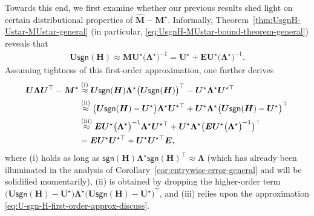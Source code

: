 Towards this end, we first examine whether our previous results shed light on certain distributional properties of $\widehat{\bm{M}}-\bm{M}^{\star}$. 
Informally,  Theorem~\ref{thm:UsgnH-Ustar-MUstar-general} (in particular, \eqref{eq:UsgnH-MUstar-bound-theorem-general}) reveals that
%
\begin{align}
	\bm{U}\mathsf{sgn}(\bm{H}) \approx \bm{M} \bm{U}^{\star} \big(\bm{\Lambda}^{\star}\big)^{-1} 
	= \bm{U}^{\star} + \bm{E} \bm{U}^{\star} \big(\bm{\Lambda}^{\star}\big)^{-1}. 
	\label{eq:U-sgn-H-first-order-approx-discuss}
\end{align}
%
Assuming tightness of this first-order approximation, one further derives 
%
\begin{align}
\bm{U}\bm{\Lambda}\bm{U}^{\top}-\bm{M}^{\star} & \overset{(\mathrm{i})}{\approx}\bm{U}\mathsf{sgn}(\bm{H})\bm{\Lambda}^{\star}\big(\bm{U}\mathsf{sgn}(\bm{H})\big)^{\top}-\bm{U}^{\star}\bm{\Lambda}^{\star}\bm{U}^{\star\top} \notag\\
 & \overset{(\mathrm{ii})}{\approx}\big(\bm{U}\mathsf{sgn}(\bm{H})-\bm{U}^{\star}\big)\bm{\Lambda}^{\star}\bm{U}^{\star\top}+\bm{U}^{\star}\bm{\Lambda}^{\star}\big(\bm{U}\mathsf{sgn}(\bm{H})-\bm{U}^{\star}\big)^{\top} 
 \notag\\
 & \overset{(\mathrm{iii})}{\approx}\bm{E}\bm{U}^{\star}\big(\bm{\Lambda}^{\star}\big)^{-1}\bm{\Lambda}^{\star}\bm{U}^{\star\top}+\bm{U}^{\star}\bm{\Lambda}^{\star}\big(\bm{E}\bm{U}^{\star}\big(\bm{\Lambda}^{\star}\big)^{-1}\big)^{\top} \notag\\
 & =\bm{E}\bm{U}^{\star}\bm{U}^{\star\top}+\bm{U}^{\star}\bm{U}^{\star\top}\bm{E}, 
	\label{eq:approx-ULambdaU-Mstar-discuss}
\end{align}
%
where (i) holds as long as $\mathsf{sgn}(\bm{H})\bm{\Lambda}^{\star} \mathsf{sgn}(\bm{H})^{\top} \approx \bm{\Lambda}$ (which has already been illuminated in the analysis 
of Corollary~\ref{cor:entrywise-error-general} and will be solidified momentarily),  
(ii) is obtained by dropping the higher-order term $\big(\bm{U}\mathsf{sgn}(\bm{H})-\bm{U}^{\star}\big)\bm{\Lambda}^{\star}\big(\bm{U}\mathsf{sgn}(\bm{H})-\bm{U}^{\star}\big)^{\top}$, and (iii) relies upon the approximation \eqref{eq:U-sgn-H-first-order-approx-discuss}.  


